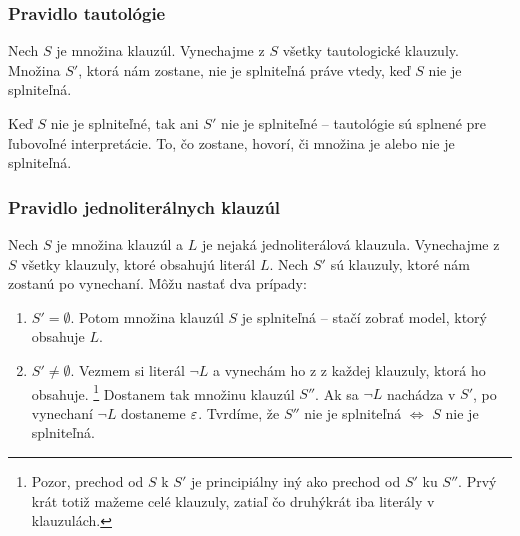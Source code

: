 \subsubsection{Pravidlo tautológie} 
Nech $S$ je množina klauzúl.
Vynechajme z $S$ všetky tautologické klauzuly.
Množina $S'$, ktorá nám zostane, nie je splniteľná práve vtedy,
keď $S$ nie je splniteľná.

\begin{dokaz}
    Keď $S$ nie je splniteľné, tak ani $S'$ nie je splniteľné --
    tautológie sú splnené pre ľubovoľné interpretácie.
    To, čo zostane, hovorí, či množina je alebo nie je splniteľná.
    \\
\end{dokaz}

\subsubsection{Pravidlo jednoliterálnych klauzúl}
Nech $S$ je množina klauzúl a $L$ je nejaká jednoliterálová klauzula.
Vynechajme z $S$ všetky klauzuly, ktoré obsahujú literál $L$.
Nech $S'$ sú klauzuly, ktoré nám zostanú po vynechaní.
Môžu nastať dva prípady:
\begin{enumerate}
    \item $S' = \emptyset$. Potom množina klauzúl $S$ je splniteľná --
        stačí zobrať model, ktorý obsahuje $L$.

    \item $S' \neq \emptyset$. Vezmem si literál $\neg L$ a vynechám
        ho z z každej klauzuly, ktorá ho obsahuje.%
        \footnote{Pozor, prechod od $S$ k $S'$ je principiálny iný ako
            prechod od $S'$ ku $S''$. Prvý krát totiž mažeme celé
            klauzuly, zatiaľ čo druhýkrát iba literály v klauzulách.}
        Dostanem tak množinu klauzúl $S''$.
        Ak sa $\neg L$ nachádza v $S'$, po vynechaní
        $\neg L$ dostaneme $\varepsilon$.
        Tvrdíme, že $S''$ nie je splniteľná
        $\iff$ $S$ nie je splniteľná.
\end{enumerate}

